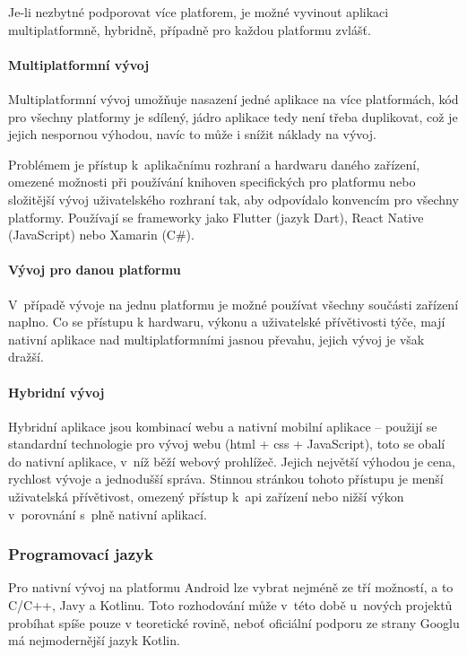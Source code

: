 \documentclass[a4paper,11pt,openany,twoside]{book}
\begin{document}
Je-li nezbytné podporovat více platforem, je možné vyvinout aplikaci multiplatformně, hybridně, případně pro každou platformu zvlášť.

\paragraph{Multiplatformní vývoj}
Multiplatformní vývoj umožňuje nasazení jedné aplikace na více platformách, kód pro všechny platformy je sdílený, jádro aplikace tedy není třeba duplikovat, což je jejich nespornou výhodou, navíc to může i snížit náklady na vývoj.

Problémem je přístup k~aplikačnímu rozhraní a hardwaru daného zařízení, omezené možnosti při používání knihoven specifických pro platformu nebo složitější vývoj uživatelského rozhraní tak, aby odpovídalo konvencím pro všechny platformy. \cite{manchanda2020where}   Používají se frameworky jako Flutter (jazyk Dart), React Native (JavaScript) nebo Xamarin (C\#).

\paragraph{Vývoj pro danou platformu}
V~případě vývoje na jednu platformu je možné používat všechny součásti zařízení naplno. Co se přístupu k hardwaru, výkonu a uživatelské přívětivosti týče, mají nativní aplikace nad multiplatformními jasnou převahu, jejich vývoj je však dražší. \cite{dennis2018native}

\paragraph{Hybridní vývoj}
Hybridní aplikace jsou kombinací webu a nativní mobilní aplikace – použijí se standardní technologie pro vývoj webu (\acs{html} + \acs{css} + JavaScript), toto se obalí do nativní aplikace, v~níž běží webový prohlížeč. Jejich největší výhodou je cena, rychlost vývoje a jednodušší správa. Stinnou stránkou tohoto přístupu je menší uživatelská přívětivost, omezený přístup k~\acs{api} zařízení nebo nižší výkon v~porovnání s~plně nativní aplikací. \cite{design2020ultimate}


\subsubsection{Programovací jazyk}
Pro nativní vývoj na platformu Android lze vybrat nejméně ze tří možností, a to C/C++, Javy a Kotlinu. Toto rozhodování může v~této době u~nových projektů probíhat spíše pouze v teoretické rovině, neboť oficiální podporu ze strany Googlu má nejmodernější jazyk Kotlin.
\end{document}
